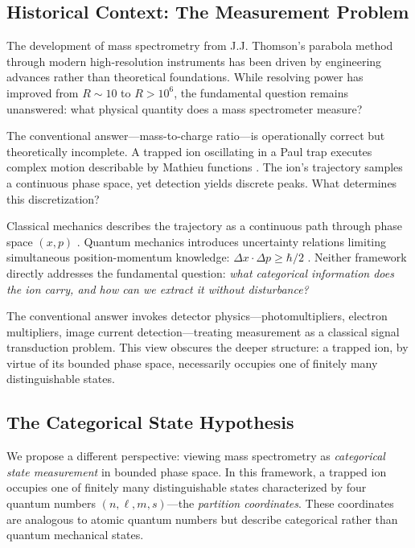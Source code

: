 \documentclass[twocolumn,10pt]{article}
\begin{document}
\subsection{Historical Context: The Measurement Problem}

The development of mass spectrometry from J.J. Thomson's parabola method \citep{thomson1913rays} through modern high-resolution instruments \citep{gross2017mass,hoffmann2007mass} has been driven by engineering advances rather than theoretical foundations. While resolving power has improved from $R \sim 10$ to $R > 10^6$, the fundamental question remains unanswered: what physical quantity does a mass spectrometer measure?

The conventional answer---mass-to-charge ratio---is operationally correct but theoretically incomplete. A trapped ion oscillating in a Paul trap executes complex motion describable by Mathieu functions \citep{paul1990electromagnetic,march2005quadrupole}. The ion's trajectory samples a continuous phase space, yet detection yields discrete peaks. What determines this discretization?

Classical mechanics describes the trajectory as a continuous path through phase space $(x, p)$ \citep{goldstein2002classical,arnold1989mathematical}. Quantum mechanics introduces uncertainty relations limiting simultaneous position-momentum knowledge: $\Delta x \cdot \Delta p \geq \hbar/2$ \citep{dirac1981principles,sakurai2017modern}. Neither framework directly addresses the fundamental question: \emph{what categorical information does the ion carry, and how can we extract it without disturbance?}

The conventional answer invokes detector physics---photomultipliers, electron multipliers, image current detection---treating measurement as a classical signal transduction problem. This view obscures the deeper structure: a trapped ion, by virtue of its bounded phase space, necessarily occupies one of finitely many distinguishable states.

\subsection{The Categorical State Hypothesis}

We propose a different perspective: viewing mass spectrometry as \emph{categorical state measurement} in bounded phase space. In this framework, a trapped ion occupies one of finitely many distinguishable states characterized by four quantum numbers $(n, \ell, m, s)$---the \emph{partition coordinates}. These coordinates are analogous to atomic quantum numbers but describe categorical rather than quantum mechanical states.
\end{document}
